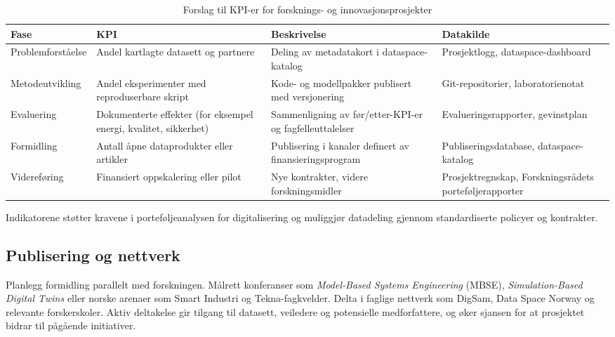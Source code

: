 \begin{table}[h]
    \centering
    \caption{Forslag til KPI-er for forsknings- og innovasjonsprosjekter}
    \label{tab:forskningsindikatorer}
    \begin{tabular}{p{2.6cm}p{3.8cm}p{3.8cm}p{3.2cm}}
        \toprule
        Fase & KPI & Beskrivelse & Datakilde \\
        \midrule
        Problemforståelse & Andel kartlagte datasett og partnere & Deling av metadatakort i dataspace-katalog & Prosjektlogg, dataspace-dashboard \\
        Metodeutvikling & Andel eksperimenter med reproduserbare skript & Kode- og modellpakker publisert med versjonering & Git-repositorier, laboratorienotat \\
        Evaluering & Dokumenterte effekter (for eksempel energi, kvalitet, sikkerhet) & Sammenligning av før/etter-KPI-er og fagfelleuttalelser & Evalueringsrapporter, gevinstplan \\
        Formidling & Antall åpne dataprodukter eller artikler & Publisering i kanaler definert av finansieringsprogram & Publiseringsdatabase, dataspace-katalog \\
        Videreføring & Finansiert oppskalering eller pilot & Nye kontrakter, videre forskningsmidler & Prosjektregnskap, Forskningsrådets porteføljerapporter \\
        \bottomrule
    \end{tabular}
\end{table}

Indikatorene støtter kravene i porteføljeanalysen for digitalisering og muliggjør datadeling gjennom standardiserte policyer og kontrakter.\citep{rcn2024digitalisering}

\subsection{Publisering og nettverk}
Planlegg formidling parallelt med forskningen. Målrett konferanser som \emph{Model-Based Systems Engineering} (MBSE), \emph{Simulation-Based Digital Twins} eller norske arenaer som Smart Industri og Tekna-fagkvelder. Delta i faglige nettverk som DigSam, Data Space Norway og relevante forskerskoler. Aktiv deltakelse gir tilgang til datasett, veiledere og potensielle medforfattere, og øker sjansen for at prosjektet bidrar til pågående initiativer.


